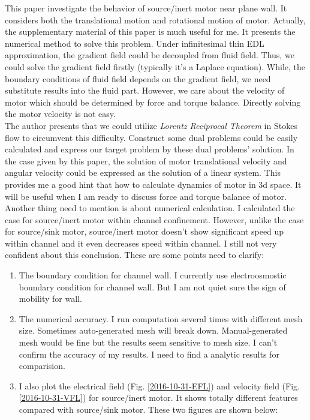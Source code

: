 \documentclass[fontsize=11pt, %
                             paper=a4, %
                             twoside, %
                             captions=tableheading,
                             index=totoc,
                             hyperref]{labbook}
\begin{document}
\begin{addmargin}[4cm]{0cm}
This paper investigate the behavior of source/inert motor near plane wall. It considers both the translational motion and rotational motion of motor. Actually, the supplementary material of this paper is much useful for me. It presents the numerical method to solve this problem. Under infinitesimal thin EDL approximation, the gradient field could be decoupled from fluid field. Thus, we could solve the gradient field firstly (typically it's a Laplace equation). While, the boundary conditions of fluid field depends on the gradient field, we need substitute results into the fluid part. However, we care about the velocity of motor which should be determined by force and torque balance. Directly solving the motor velocity is not easy.\\
The author presents that we could utilize \emph{Lorentz Reciprocal Theorem} in Stokes flow to circumvent this difficulty. Construct some dual problems could be easily calculated and express our target problem by these dual problems' solution. In the case given by this paper, the solution of motor translational velocity and angular velocity could be expressed as the solution of a linear system. This provides me a good hint that how to calculate dynamics of motor in 3d space. It will be useful when I am ready to discuss force and torque balance of motor.
\\
Another thing need to mention is about numerical calculation. I calculated the case for source/inert motor within channel confinement. However, unlike the case for source/sink motor, source/inert motor doesn't show significant speed up within channel and it even decreases speed within channel. I still not very confident about this conclusion. These are some points need to clarify:
\begin{enumerate}
\item
The boundary condition for channel wall. I currently use electroosmostic boundary condition for channel wall. But I am not quiet sure the sign of mobility for wall.
\item
The numerical accuracy. I run computation several times with different mesh size. Sometimes auto-generated mesh will break down. Manual-generated mesh would be fine but the results seem sensitive to mesh size. I can't confirm the accuracy of my results. I need to find a analytic results for comparision.
\item
I also plot the electrical field (Fig. \ref{2016-10-31-EFL}) and velocity field (Fig. \ref{2016-10-31-VFL}) for source/inert motor. It shows totally different features compared with source/sink motor. These two figures are shown below: 

\end{enumerate}
\end{addmargin}
\end{document}
